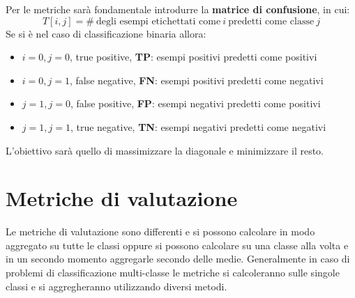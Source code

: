 Per le metriche sarà fondamentale introdurre la \textbf{matrice di confusione},
in cui:
\begin{equation}
    T[i,j] = \# \ \text{degli esempi etichettati come} \ i \ \text{predetti come
        classe} \ j
\end{equation}
Se si è nel caso di classificazione binaria allora:
\begin{itemize}
    \item $i=0, j=0$, true positive, \textbf{TP}: esempi positivi predetti come
          positivi
    \item $i=0, j=1$, false negative, \textbf{FN}: esempi positivi predetti come
          negativi
    \item $j=1, j=0$, false positive, \textbf{FP}: esempi negativi predetti come
          positivi
    \item $j=1, j=1$, true negative, \textbf{TN}: esempi negativi predetti come
          negativi
\end{itemize}
L'obiettivo sarà quello di massimizzare la diagonale e minimizzare il resto.
\section{Metriche di valutazione}
Le metriche di valutazione sono differenti e si possono calcolare in modo aggregato
su tutte le classi oppure si possono calcolare su una classe alla volta e in un
secondo momento aggregarle secondo delle medie. Generalmente in caso di problemi
di classificazione multi-classe le metriche si calcoleranno sulle singole classi e
si aggregheranno utilizzando diversi metodi.


